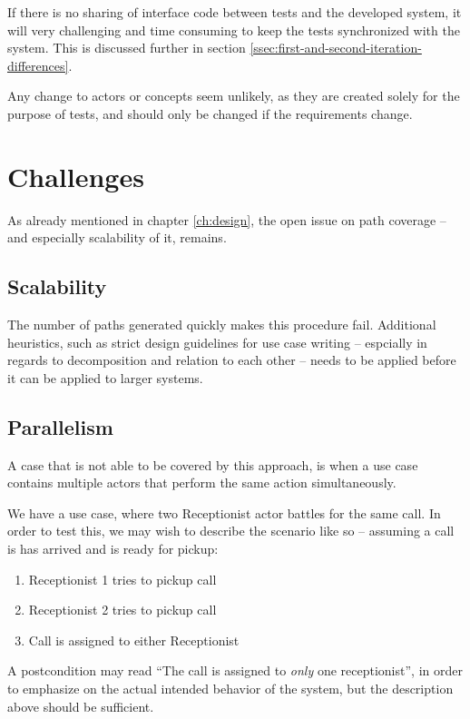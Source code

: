 \noindent If there is no sharing of interface code between tests and the developed system, it will very challenging and time consuming to keep the tests synchronized with the system. This is discussed further in section \ref{ssec:first-and-second-iteration-differences}.\medskip

\noindent Any change to actors or concepts seem unlikely, as they are created solely for the purpose of tests, and should only be changed if the requirements change.

\section{Challenges}
As already mentioned in chapter \ref{ch:design}, the open issue on path coverage -- and especially scalability of it, remains.

\subsection{Scalability}
\label{sec:scalability}
The number of paths generated quickly makes this procedure fail. Additional heuristics, such as strict design guidelines for use case writing -- espcially in regards to decomposition and relation to each other -- needs to be applied before it can be applied to larger systems.



\subsection{Parallelism}
\label{sec:parallelism}
A case that is not able to be covered by this approach, is when a use case contains multiple actors that perform the same action simultaneously.\medskip

\noindent We have a use case, where two Receptionist actor battles for the same call. In order to test this, we may wish to describe the scenario like so -- assuming a call is has arrived and is ready for pickup:
\begin{enumerate}
 \item Receptionist 1 tries to pickup call
 \item Receptionist 2 tries to pickup call
 \item Call is assigned to either Receptionist
\end{enumerate}
A postcondition may read ``The call is assigned to \emph{only} one receptionist'', in order to emphasize on the actual intended behavior of the system, but the description above should be sufficient.\medskip

